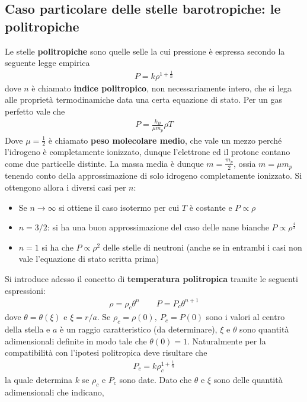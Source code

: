 \documentclass[a4paper, oneside]{book}
\begin{document}
\subsection{Caso particolare delle stelle barotropiche: le politropiche}
Le stelle \textbf{politropiche} sono quelle selle la cui pressione è espressa secondo la seguente 
legge empirica
\begin{align}
    P = k\rho^{1 + \frac{1}{n}}
\end{align}
dove $n$ è chiamato \textbf{indice politropico}, non necessariamente intero, che si lega alle proprietà termodinamiche data una certa 
equazione di stato. Per un gas perfetto vale che
\begin{align}
    P = \frac{k_B}{\mu m_p} \rho T 
\end{align}
Dove $\mu = \frac{1}{2}$ è chiamato \textbf{peso molecolare medio}, che vale un mezzo 
perché l'idrogeno è completamente ionizzato, dunque l'elettrone ed il protone 
contano come due particelle distinte. La massa media è dunque $m = \frac{m_p}{2}$, 
ossia $m = \mu m_p$ tenendo conto della approssimazione di solo idrogeno completamente ionizzato.
Si ottengono allora i diversi casi per $n$: 
\begin{itemize}
    \item Se $n \to \infty $ si ottiene il caso isotermo per cui $T$ è costante e $P \propto \rho$
    \item $n = 3/2$: si ha una buon approssimazione del caso delle nane bianche $P \propto \rho^{\frac{4}{3}}$
    \item $n = 1$ si ha che $P \propto \rho^{2}$ delle stelle di neutroni (anche se in entrambi 
    i casi non vale l'equazione di stato scritta prima)
\end{itemize}
Si introduce adesso il concetto di \textbf{temperatura politropica} tramite le seguenti espressioni:
\begin{gather*}
    \rho = \rho_c \theta^{n} \qquad P = P_c \theta^{n + 1}
\end{gather*}
dove $\theta = \theta(\xi)$ e $\xi = r/a$. Se $\rho_c = \rho(0), \ P_c= P(0)$ sono i valori 
al centro della stella e $a$ è un raggio caratteristico (da determinare), $\xi$ e $\theta$ sono 
quantità adimensionali definite in modo tale che $\theta(0) = 1$. Naturalmente per la compatibilità con l'ipotesi politropica 
deve risultare che
\begin{gather*}
    P_c = k\rho_c^{1 + \frac{1}{n}}
\end{gather*}
la quale determina $k$ se $\rho_c$ e $P_c$ sono date. Dato che $\theta$ e $\xi$ sono delle quantità adimensionali che indicano, 
\end{document}
